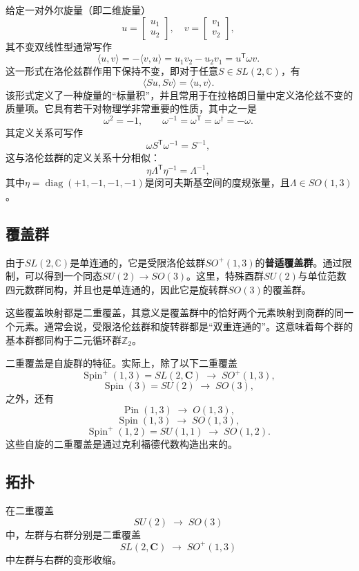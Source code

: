给定一对外尔旋量（即二维旋量）
\[
u = 
\begin{bmatrix}
u_{1} \\
u_{2}
\end{bmatrix},
\quad
v = 
\begin{bmatrix}
v_{1} \\
v_{2}
\end{bmatrix},~
\]
其不变双线性型通常写作
\[
\langle u, v \rangle = -\langle v, u \rangle
= u_{1}v_{2} - u_{2}v_{1}
= u^{\textsf{T}} \omega v.~
\]
这一形式在洛伦兹群作用下保持不变，即对于任意$S \in SL(2,\mathbb{C})$，有
\[
\langle Su, Sv \rangle = \langle u, v \rangle.~
\]
该形式定义了一种旋量的“标量积”，并且常用于在拉格朗日量中定义洛伦兹不变的质量项。它具有若干对物理学非常重要的性质，其中之一是
\[
\omega^{2} = -1,
\qquad
\omega^{-1} = \omega^{\textsf{T}} = \omega^{\dagger} = -\omega.~
\]
其定义关系可写作
\[
\omega S^{\textsf{T}} \omega^{-1} = S^{-1},~
\]
这与洛伦兹群的定义关系十分相似：
\[
\eta \Lambda^{\textsf{T}} \eta^{-1} = \Lambda^{-1},~
\]
其中$\eta = \operatorname{diag}(+1, -1, -1, -1)$是闵可夫斯基空间的度规张量，且$\Lambda \in SO(1,3)$。
\subsection{覆盖群}
由于$SL(2,\mathbb{C})$是单连通的，它是受限洛伦兹群$SO^{+}(1,3)$的\textbf{普适覆盖群}。通过限制，可以得到一个同态$SU(2) \to SO(3)$。这里，特殊酉群$SU(2)$与单位范数四元数群同构，并且也是单连通的，因此它是旋转群$SO(3)$的覆盖群。

这些覆盖映射都是二重覆盖，其意义是覆盖群中的恰好两个元素映射到商群的同一个元素。通常会说，受限洛伦兹群和旋转群都是“双重连通的”。这意味着每个群的基本群都同构于二元循环群$\mathbb{Z}_{2}$。

二重覆盖是自旋群的特征。实际上，除了以下二重覆盖
\[
\operatorname{Spin}^{+}(1,3) = SL(2,\mathbf{C}) \;\longrightarrow\; SO^{+}(1,3),~
\]
\[
\operatorname{Spin}(3) = SU(2) \;\longrightarrow\; SO(3),~
\]
之外，还有
\[
\operatorname{Pin}(1,3) \;\longrightarrow\; O(1,3),~
\]
\[
\operatorname{Spin}(1,3) \;\longrightarrow\; SO(1,3),~
\]
\[
\operatorname{Spin}^{+}(1,2) = SU(1,1) \;\longrightarrow\; SO(1,2).~
\]
这些自旋的二重覆盖是通过克利福德代数构造出来的。
\subsection{拓扑}
在二重覆盖
\[
SU(2) \;\longrightarrow\; SO(3)~
\]
中，左群与右群分别是二重覆盖
\[
SL(2,\mathbf{C}) \;\longrightarrow\; SO^{+}(1,3)~
\]
中左群与右群的变形收缩。

